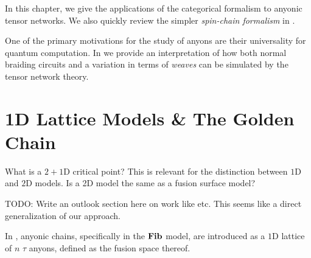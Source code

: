 In this chapter, we give the applications of the categorical formalism to
anyonic tensor networks. We also quickly review the simpler \emph{spin-chain
formalism} in .

One of the primary motivations for the study of anyons are their universality
for quantum computation. In  we provide an interpretation of
how both normal braiding circuits and a variation in terms of \emph{weaves} can
be simulated by the tensor network theory.

\begin{literature}
  \cite{pfeiferFiniteDensityMatrix2015,pfeiferSimulationAnyonsTensor2010,pfeiferSimulationAnyonsUsing2012,pfeiferMeasuresEntanglementNonAbelian2014,singhMatrixProductStates2014}
\end{literature}


\section{1D Lattice Models \& The Golden
Chain}\label{anyon:sec:lattice_spin_chains}


What is a $2+1$D critical point? This is relevant for the distinction between
$1$D and $2$D models. Is a 2D model the same as a fusion surface model?

TODO: Write an outlook section here on work like
\cite{lootensDualitiesOnedimensionalQuantum2024}
\cite{eckQuantumLatticeModels2025} etc. This seems like a direct generalization
of our approach.

In \cite{feiguinInteractingAnyonsTopological2007}, anyonic chains, specifically
in the $\mathbf{Fib}$ model, are introduced as a $1$D lattice of $n$ $\tau$ anyons,
defined as the fusion space thereof.

